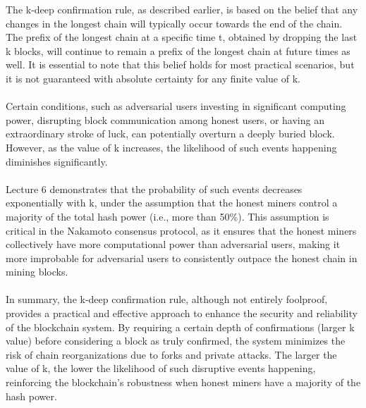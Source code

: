 \documentclass{report}
\begin{document}
The k-deep confirmation rule, as described earlier, is based on the belief that any changes in the longest chain will typically occur towards the end of the chain. The prefix of the longest chain at a specific time t, obtained by dropping the last k blocks, will continue to remain a prefix of the longest chain at future times as well. It is essential to note that this belief holds for most practical scenarios, but it is not guaranteed with absolute certainty for any finite value of k.\\\\
Certain conditions, such as adversarial users investing in significant computing power, disrupting block communication among honest users, or having an extraordinary stroke of luck, can potentially overturn a deeply buried block. However, as the value of k increases, the likelihood of such events happening diminishes significantly.\\\\
Lecture 6 demonstrates that the probability of such events decreases exponentially with k, under the assumption that the honest miners control a majority of the total hash power (i.e., more than 50\%). This assumption is critical in the Nakamoto consensus protocol, as it ensures that the honest miners collectively have more computational power than adversarial users, making it more improbable for adversarial users to consistently outpace the honest chain in mining blocks.\\\\
In summary, the k-deep confirmation rule, although not entirely foolproof, provides a practical and effective approach to enhance the security and reliability of the blockchain system. By requiring a certain depth of confirmations (larger k value) before considering a block as truly confirmed, the system minimizes the risk of chain reorganizations due to forks and private attacks. The larger the value of k, the lower the likelihood of such disruptive events happening, reinforcing the blockchain's robustness when honest miners have a majority of the hash power.\\\\
\end{document}

